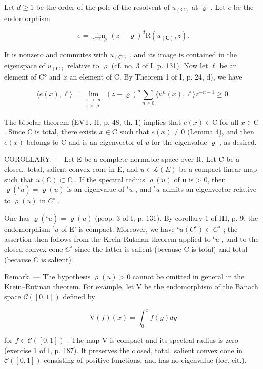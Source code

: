 Let \(d \geqslant 1\) be the order of the pole of the resolvent of \(u_{(\mathbf{C})}\) at \(\varrho\) . Let \(e\) be the endomorphism

\[
e = \lim _ {z \to \varrho} (z - \varrho) ^ {d} \mathrm{R} (u _ {(\mathbf {C})}, z).
\]

It is nonzero and commutes with \(u_{(\mathbf{C})}\) , and its image is contained in the eigenspace of \(u_{(\mathbf{C})}\) relative to \(\varrho\) (cf. no. 3 of I, p. 131). Now let \(\ell\) be an element of C° and \(x\) an element of C. By Theorem 1 of I, p. 24, d), we have

\[
\langle e(x),\ell \rangle = \lim_{\substack{z\to \varrho \\ z > \varrho}}(z - \varrho)^{d}\sum_{n\geqslant 0}\langle u^{n}(x),\ell \rangle z^{-n - 1}\geqslant 0.
\]

The bipolar theorem (EVT, II, p. 48, th. 1) implies that \(e(x) \in \mathrm{C}\) for all \(x \in \mathrm{C}\) . Since \(\mathrm{C}\) is total, there exists \(x \in \mathrm{C}\) such that \(e(x) \neq 0\) (Lemma 4), and then \(e(x)\) belongs to \(\mathrm{C}\) and is an eigenvector of \(u\) for the eigenvalue \(\varrho\) , as desired.

COROLLARY. --- Let E be a complete normable space over R. Let C be a closed, total, salient convex cone in E, and \(u \in \mathcal{L}(E)\) be a compact linear map such that \(u(\mathrm{C}) \subset \mathrm{C}\) . If the spectral radius \(\varrho(u)\) of u is \textgreater{} 0, then \(\varrho(^{t}u) = \varrho(u)\) is an eigenvalue of \(^{t}u\) , and \(^{t}u\) admits an eigenvector relative to \(\varrho(u)\) in \(C^{\circ}\) .

One has \(\varrho(^{t}u) = \varrho(u)\) (prop. 3 of I, p. 131). By corollary 1 of III, p. 9, the endomorphism \(^{t}u\) of E' is compact. Moreover, we have \(^{t}u(C^{\circ}) \subset C^{\circ}\) ; the assertion then follows from the Krein-Rutman theorem applied to \(^{t}u\) , and to the closed convex cone \(C^{\circ}\) since the latter is salient (because C is total) and total (because C is salient).

Remark. --- The hypothesis \(\varrho(u) > 0\) cannot be omitted in general in the Krein–Rutman theorem. For example, let V be the endomorphism of the Banach space \(\mathcal{C}([0,1])\) defined by

\[
\mathrm{V} (f) (x) = \int_ {0} ^ {x} f (y) d y
\]

for \(f \in \mathcal{C}([0,1])\) . The map V is compact and its spectral radius is zero (exercise 1 of I, p. 187). It preserves the closed, total, salient convex cone in \(\mathcal{C}([0,1])\) consisting of positive functions, and has no eigenvalue (loc. cit.).

